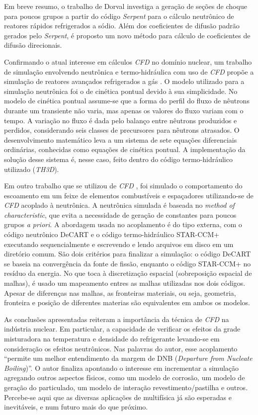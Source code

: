 Em breve resumo, o trabalho de Dorval \cite{Dorval2015} investiga
a geração de seções de choque para poucos grupos a partir do código \textit{Serpent} para
o cálculo neutrônico de reatores rápidos refrigerados a sódio. Além dos coeficientes de
difusão padrão gerados pelo \textit{Serpent}, é proposto um novo método para cálculo de
coeficientes de difusão direcionais. 

Confirmando o atual interesse em cálculos \textit{CFD} no domínio nuclear, um trabalho de simulação envolvendo
neutrônica e termo-hidráulica com uso de \textit{CFD} propõe a simulação de reatores avançados refrigerados
a gás \cite{Hossain2011}. O modelo utilizado 
para a simulação neutrônica foi o de cinética pontual devido à sua simplicidade. No modelo 
de cinética pontual assume-se que a forma do perfil do fluxo de nêutrons durante um transiente 
não varia, mas apenas os valores do fluxo variam com o tempo. A variação no fluxo é dada 
pelo balanço entre nêutrons produzidos e perdidos, considerando seis classes de precursores 
para nêutrons atrasados. O desenvolvimento matemático leva a um sistema de sete equações diferenciais 
ordinárias, conhecidas como equações de cinética pontual. A implementação da solução desse sistema 
é, nesse caso, feito dentro do código termo-hidráulico utilizado (\textit{TH3D}).

Em outro trabalho que se utilizou de \textit{CFD} \cite{Yan2011}, foi simulado o comportamento do escoamento em um feixe de elementos 
combustíveis e espaçadores utilizando-se de \textit{CFD} acoplado à neutrônica. A neutrônica 
simulada é baseada no \textit{method of characteristic}, que evita a necessidade de geração 
de constantes para poucos grupos \textit{a priori}. A abordagem usada no 
acoplamento é do tipo externa, com o código neutrônico DeCART e o código termo-hidráulico 
STAR-CCM+ executando sequencialmente e escrevendo e lendo arquivos em disco em um 
diretório comum. São dois critérios para finalizar a simulação: o código DeCART se baseia 
na convergência da fonte de fissão, enquanto o código STAR-CCM+ no resíduo da energia. No que toca à 
discretização espacial (sobreposição espacial de malhas), é usado um mapeamento entres as malhas 
utilizadas nos dois códigos. Apesar de diferenças nas malhas, as fronteiras materiais, ou seja, geometria, 
fronteira e posição de diferentes materias são equivalentes em ambos os modelos.

As conclusões apresentadas reiteram a importância da técnica de \textit{CFD} na indústria nuclear. Em particular, 
a capacidade de verificar os efeitos da grade misturadora na temperatura e densidade do refrigerante 
levando-se em consideração os efeitos neutrônicos. Nas palavras do autor, esse acoplamento 
``permite um melhor entendimento da margem de DNB (\textit{Departure from Nucleate Boiling})''.
O autor finaliza apontando o interesse em incrementar a simulação 
agregando outros aspectos físicos, como um modelo de corrosão, um modelo de geração do particulado, 
um modelo de interação revestimento/pastilha e outros. Percebe-se aqui que as diversas aplicações 
de multifísica já são esperadas e inevitáveis, e num futuro mais do que próximo.

